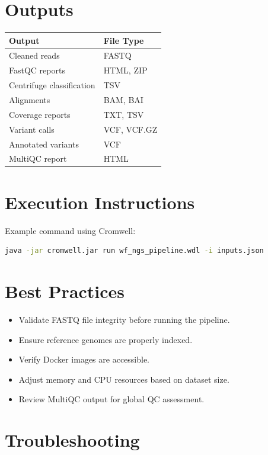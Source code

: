 \documentclass[13pt,letter]{article}
\begin{document}
\section{Outputs}

\begin{longtable}{ll}
\toprule
\textbf{Output} & \textbf{File Type} \\
\midrule
Cleaned reads & FASTQ \\
FastQC reports & HTML, ZIP \\
Centrifuge classification & TSV \\
Alignments & BAM, BAI \\
Coverage reports & TXT, TSV \\
Variant calls & VCF, VCF.GZ \\
Annotated variants & VCF \\
MultiQC report & HTML \\
\bottomrule
\end{longtable}

\section{Execution Instructions}

Example command using Cromwell:

\begin{lstlisting}[language=bash]
  java -jar cromwell.jar run wf_ngs_pipeline.wdl -i inputs.json
\end{lstlisting}

\section{Best Practices}

\begin{itemize}
  \item Validate FASTQ file integrity before running the pipeline.
  \item Ensure reference genomes are properly indexed.
  \item Verify Docker images are accessible.
  \item Adjust memory and CPU resources based on dataset size.
  \item Review MultiQC output for global QC assessment.
\end{itemize}

\section{Troubleshooting}
\end{document}
